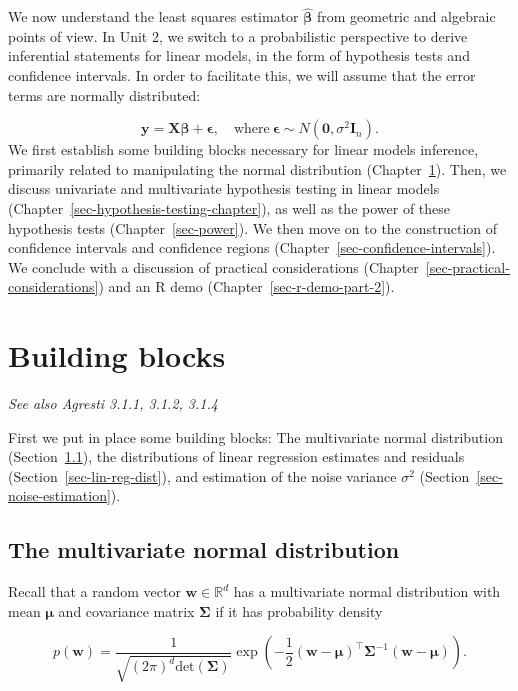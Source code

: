 \documentclass[
  11pt,
  letterpaper,
  oneside]{book}
\theoremstyle{plain}
\theoremstyle{plain}
\theoremstyle{definition}
\theoremstyle{definition}
\theoremstyle{plain}
\theoremstyle{remark}
\begin{document}
We now understand the least squares estimator
\(\boldsymbol{\widehat{\beta}}\) from geometric and algebraic points of
view. In Unit 2, we switch to a probabilistic perspective to derive
inferential statements for linear models, in the form of hypothesis
tests and confidence intervals. In order to facilitate this, we will
assume that the error terms are normally distributed:

\[
\boldsymbol{y} = \boldsymbol{X} \boldsymbol{\beta} + \boldsymbol{\epsilon}, \quad \text{where} \ \boldsymbol{\epsilon} \sim N(\boldsymbol{0}, \sigma^2 \boldsymbol{I}_n).
\] We first establish some building blocks necessary for linear models
inference, primarily related to manipulating the normal distribution
(Chapter~\ref{sec-building-blocks}). Then, we discuss univariate and
multivariate hypothesis testing in linear models
(Chapter~\ref{sec-hypothesis-testing-chapter}), as well as the power of
these hypothesis tests (Chapter~\ref{sec-power}). We then move on to the
construction of confidence intervals and confidence regions
(Chapter~\ref{sec-confidence-intervals}). We conclude with a discussion
of practical considerations (Chapter~\ref{sec-practical-considerations})
and an R demo (Chapter~\ref{sec-r-demo-part-2}).

\hypertarget{sec-building-blocks}{%
\chapter{Building blocks}\label{sec-building-blocks}}

\emph{See also Agresti 3.1.1, 3.1.2, 3.1.4}

First we put in place some building blocks: The multivariate normal
distribution (Section~\ref{sec-mvrnorm}), the distributions of linear
regression estimates and residuals (Section~\ref{sec-lin-reg-dist}), and
estimation of the noise variance \(\sigma^2\)
(Section~\ref{sec-noise-estimation}).

\hypertarget{sec-mvrnorm}{%
\section{The multivariate normal distribution}\label{sec-mvrnorm}}

Recall that a random vector \(\boldsymbol{w} \in \mathbb{R}^d\) has a
multivariate normal distribution with mean \(\boldsymbol{\mu}\) and
covariance matrix \(\boldsymbol{\Sigma}\) if it has probability density

\[
p(\boldsymbol{w}) = \frac{1}{\sqrt{(2\pi)^{d}\text{det}(\boldsymbol{\Sigma})}}\exp\left(-\frac{1}{2}(\boldsymbol{w} - \boldsymbol{\mu})^\top \boldsymbol{\Sigma}^{-1}(\boldsymbol{w} - \boldsymbol{\mu})\right).
\]
\end{document}

